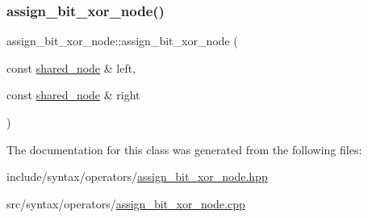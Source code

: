 \subsubsection{\texorpdfstring{assign\+\_\+bit\+\_\+xor\+\_\+node()}{assign\_bit\_xor\_node()}}
{\footnotesize\ttfamily assign\+\_\+bit\+\_\+xor\+\_\+node\+::assign\+\_\+bit\+\_\+xor\+\_\+node (\begin{DoxyParamCaption}\item[{const \hyperlink{namespacejawe_a3f307481d921b6cbb50cc8511fc2b544}{shared\+\_\+node} \&}]{left,  }\item[{const \hyperlink{namespacejawe_a3f307481d921b6cbb50cc8511fc2b544}{shared\+\_\+node} \&}]{right }\end{DoxyParamCaption})}



The documentation for this class was generated from the following files\+:\begin{DoxyCompactItemize}
\item 
include/syntax/operators/\hyperlink{assign__bit__xor__node_8hpp}{assign\+\_\+bit\+\_\+xor\+\_\+node.\+hpp}\item 
src/syntax/operators/\hyperlink{assign__bit__xor__node_8cpp}{assign\+\_\+bit\+\_\+xor\+\_\+node.\+cpp}\end{DoxyCompactItemize}
